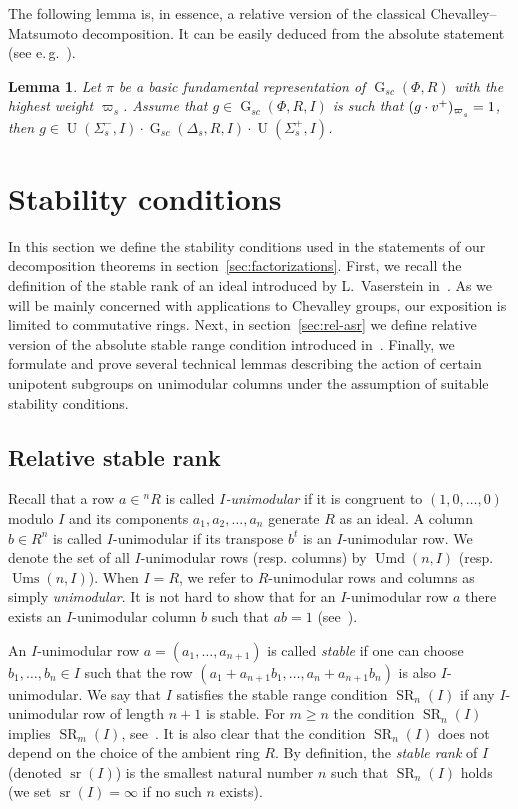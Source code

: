 \documentclass[11pt]{amsart}
\theoremstyle{plain}
\numberwithin{equation}{section}
\newtheorem{lemma}{Lemma}
\numberwithin{lemma}{section}
\theoremstyle{definition}
\theoremstyle{remark}
\DeclareMathOperator{\G}{G}
\DeclareMathOperator{\U}{U}
\DeclareMathOperator{\SR}{SR}
\DeclareMathOperator{\sr}{sr}
\DeclareMathOperator{\Ums}{Ums}
\DeclareMathOperator{\Umd}{Umd}
\def\ssub#1{\mathchoice
   {_{\lower2pt\hbox{$\scriptstyle #1$}}}
   {_{\lower2pt\hbox{$\scriptstyle #1$}}}
   {_{\lower1.5pt\hbox{$\scriptscriptstyle #1$}}}
   {_{\!\lower1.5pt\hbox{$\scriptscriptstyle #1$}}}}
\begin{document}
The following lemma is, in essence, a relative version of the classical Chevalley--Matsumoto decomposition.
It can be easily deduced from the absolute statement (see e.\,g.~\cite[Theorem~1.3]{St78}).
\begin{lemma}\label{lemma:Chevalley-Matsumoto}
Let $\pi$ be a basic fundamental representation of $\G_{sc}(\Phi, R)$ with the highest weight $\varpi_s$.
Assume that $g\in \G_{sc}(\Phi, R, I)$ is such that $(g\cdot v^+)_{\varpi\ssub{s}}=1$, then $g \in \U(\Sigma_s^-, I) \cdot \G_{sc}(\Delta_s, R, I) \cdot \U(\Sigma_s^+, I)$.
\end{lemma}

\section{Stability conditions}\label{sec:stability-conditions}
In this section we define the stability conditions used in the statements of our decomposition theorems in section~\ref{sec:factorizations}.
First, we recall the definition of the stable rank of an ideal introduced by L.~Vaserstein in~\cite{Va69, Va71}.
As we will be mainly concerned with applications to Chevalley groups, our exposition is limited to commutative rings.
Next, in section~\ref{sec:rel-asr} we define relative version of the absolute stable range condition introduced in~\cite{EO, MKV}.
Finally, we formulate and prove several technical lemmas describing the action of certain unipotent subgroups on unimodular columns under the assumption of suitable stability conditions.

\subsection{Relative stable rank}
Recall that a row $a\in{}^n\!R$ is called \emph{$I$-unimodular} if it is congruent to $(1, 0, \ldots, 0)$ modulo $I$ and its components $a_1, a_2, \ldots, a_n$ generate $R$ as an ideal.
A column $b \in R^n$ is called $I$-unimodular if its transpose $b^t$ is an $I$-unimodular row.
We denote the set of all $I$-unimodular rows (resp. columns) by $\Umd(n, I)$ (resp. $\Ums(n, I)$).
When $I=R$, we refer to $R$-unimodular rows and columns as simply \emph{unimodular}.
It is not hard to show that for an $I$-unimodular row $a$ there exists an $I$-unimodular column $b$ such that $ab=1$ (see~\cite[\S2]{Va69}).

An $I$-unimodular row $a=(a_1, \ldots, a_{n+1})$ is called \emph{stable} if one can choose $b_1, \ldots, b_n\in I$ such that the row $(a_1+a_{n+1}b_1, \ldots, a_n+a_{n+1}b_n)$ is also $I$-unimodular. 
We say that $I$ satisfies the stable range condition $\SR_n(I)$ if any $I$-unimodular row of length $n+1$ is stable.
For $m \geqslant n$ the condition $\SR_n(I)$ implies $\SR_m(I)$, see~\cite[Theorem~1]{Va71}.
It is also clear that the condition $\SR_n(I)$ does not depend on the choice of the ambient ring $R$.
By definition, the \emph{stable rank} of $I$ (denoted $\sr(I)$) is the smallest natural number $n$ such that $\SR_n(I)$ holds (we set $\sr(I)=\infty$ if no such $n$ exists).
\end{document}

